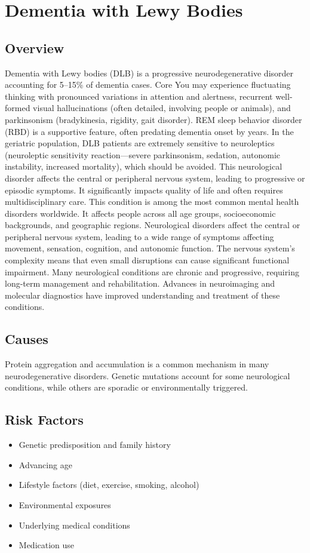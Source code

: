 \chapter{Dementia with Lewy Bodies}
\label{sec:Dementia with Lewy Bodies}

\section{Overview}
Dementia with Lewy bodies (DLB) is a progressive neurodegenerative disorder accounting for 5--15\% of dementia cases. Core You may experience fluctuating thinking with pronounced variations in attention and alertness, recurrent well-formed visual hallucinations (often detailed, involving people or animals), and parkinsonism (bradykinesia, rigidity, gait disorder). REM sleep behavior disorder (RBD) is a supportive feature, often predating dementia onset by years. In the geriatric population, DLB patients are extremely sensitive to neuroleptics (neuroleptic sensitivity reaction---severe parkinsonism, sedation, autonomic instability, increased mortality), which should be avoided. This neurological disorder affects the central or peripheral nervous system, leading to progressive or episodic symptoms. It significantly impacts quality of life and often requires multidisciplinary care. This condition is among the most common mental health disorders worldwide. It affects people across all age groups, socioeconomic backgrounds, and geographic regions. Neurological disorders affect the central or peripheral nervous system, leading to a wide range of symptoms affecting movement, sensation, cognition, and autonomic function. The nervous system's complexity means that even small disruptions can cause significant functional impairment. Many neurological conditions are chronic and progressive, requiring long-term management and rehabilitation. Advances in neuroimaging and molecular diagnostics have improved understanding and treatment of these conditions.
\section{Causes}
Protein aggregation and accumulation is a common mechanism in many neurodegenerative disorders.  Genetic mutations account for some neurological conditions, while others are sporadic or environmentally triggered.   
\section{Risk Factors}
\begin{itemize}[noitemsep]
  \item Genetic predisposition and family history
  \item Advancing age
  \item Lifestyle factors (diet, exercise, smoking, alcohol)
  \item Environmental exposures
  \item Underlying medical conditions
  \item Medication use
\end{itemize}
